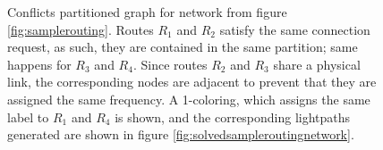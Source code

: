 \begin{figure}[h]

		\centering	
	
		\caption{Conflicts partitioned graph for network from figure \ref{fig:samplerouting}. Routes $R_1$ and $R_2$ satisfy the same connection request, as such, they are contained in the same partition; same happens for $R_3$ and $R_4$. Since routes $R_2$ and $R_3$ share a physical link, the corresponding nodes are adjacent to prevent that they are assigned the same frequency. A 1-coloring, which assigns the same label to $R_1$ and $R_4$ is shown, and the corresponding lightpaths generated are shown in figure \ref{fig:solvedsampleroutingnetwork}.}

		\label{fig:solvedsamplerouting}
\end{figure}

